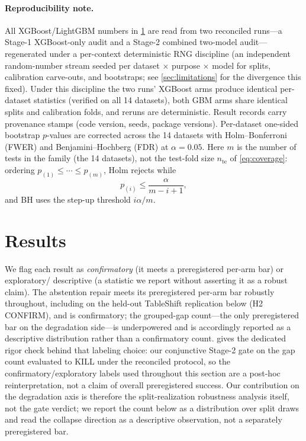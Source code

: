 \documentclass[pdflatex,sn-mathphys-num]{sn-jnl}
\begin{document}
\paragraph{Reproducibility note.} All XGBoost/LightGBM numbers in \cref{sec:results} are read from two
reconciled runs---a Stage-1 XGBoost-only audit and a Stage-2 combined two-model audit---regenerated under a
per-context deterministic RNG discipline (an independent random-number stream seeded per dataset
$\times$ purpose $\times$ model for splits, calibration carve-outs, and bootstraps; see \cref{sec:limitations} for
the divergence this fixed). Under this discipline the two runs' XGBoost arms produce identical
per-dataset statistics (verified on all 14 datasets), both GBM arms share identical
splits and calibration folds, and reruns are deterministic. Result records carry provenance stamps
(code version, seeds, package versions). Per-dataset one-sided bootstrap $p$-values are corrected across the
14 datasets with Holm--Bonferroni (FWER) and Benjamini--Hochberg (FDR) at $\alpha=0.05$.
Here $m$ is the number of tests in the family (the 14 datasets), not the test-fold size $n_{\mathrm{te}}$ of \eqref{eq:coverage}:
ordering $p_{(1)}\le\cdots\le p_{(m)}$, Holm rejects while
\begin{equation}
\label{eq:holm}
p_{(i)}\le\frac{\alpha}{m-i+1},
\end{equation}
and BH uses the step-up threshold $i\alpha/m$.

\section{Results}\label{sec:results}
We flag each result as \emph{confirmatory} (it meets a preregistered per-arm bar) or exploratory/
descriptive (a statistic we report without asserting it as a robust claim). The abstention repair meets its
preregistered per-arm bar robustly throughout, including on the held-out TableShift replication below (H2
CONFIRM), and is confirmatory; the grouped-gap count---the only preregistered
bar on the degradation side---is underpowered and is accordingly reported as a descriptive distribution
rather than a confirmatory count.  gives the dedicated rigor check behind that
labeling choice: our conjunctive Stage-2 gate on the gap count evaluated to KILL under the reconciled
protocol, so the confirmatory/exploratory labels used throughout this section are a post-hoc
reinterpretation, not a claim of overall preregistered success. Our contribution on the degradation axis is
therefore the split-realization robustness analysis itself, not the gate verdict; we report the count below
as a distribution over split draws and read the collapse direction as a descriptive observation, not a
separately preregistered bar.
\end{document}
